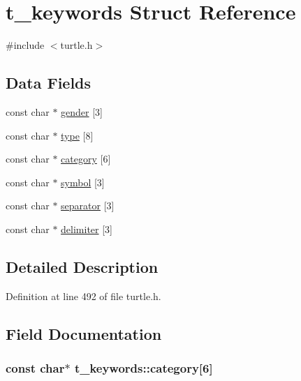 \hypertarget{structt__keywords}{\section{t\-\_\-keywords Struct Reference}
\label{structt__keywords}
}


{\ttfamily \#include $<$turtle.\-h$>$}

\subsection*{Data Fields}
\begin{DoxyCompactItemize}
\item 
const char $\ast$ \hyperlink{structt__keywords_a06ddda8029be04bf68c7ade6dfc4437a}{gender} \mbox{[}3\mbox{]}
\item 
const char $\ast$ \hyperlink{structt__keywords_aa61a0a794bd0f3603eabc95469b7ca3a}{type} \mbox{[}8\mbox{]}
\item 
const char $\ast$ \hyperlink{structt__keywords_abce2a89b290a5ccdd8bc245230363c12}{category} \mbox{[}6\mbox{]}
\item 
const char $\ast$ \hyperlink{structt__keywords_aa821df09f18dd1e77636e08dff5e0dde}{symbol} \mbox{[}3\mbox{]}
\item 
const char $\ast$ \hyperlink{structt__keywords_ab5f53aff6370dc198899e02fd7800712}{separator} \mbox{[}3\mbox{]}
\item 
const char $\ast$ \hyperlink{structt__keywords_a6c45bf927b140fadb72f9fb559de8747}{delimiter} \mbox{[}3\mbox{]}
\end{DoxyCompactItemize}


\subsection{Detailed Description}


Definition at line 492 of file turtle.\-h.



\subsection{Field Documentation}
\hypertarget{structt__keywords_abce2a89b290a5ccdd8bc245230363c12}{
\subsubsection[{category}]{\setlength{\rightskip}{0pt plus 5cm}const char$\ast$ t\-\_\-keywords\-::category\mbox{[}6\mbox{]}}}\label{structt__keywords_abce2a89b290a5ccdd8bc245230363c12}


